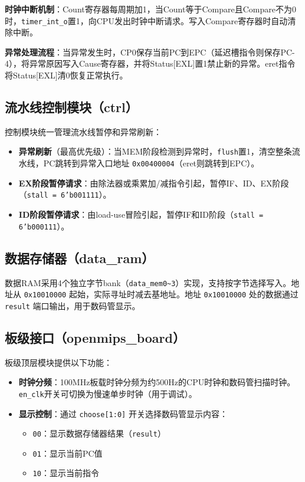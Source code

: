 \textbf{时钟中断机制}：Count寄存器每周期加1，当Count等于Compare且Compare不为0时，\texttt{timer\_int\_o}置1，向CPU发出时钟中断请求。写入Compare寄存器时自动清除中断。

\textbf{异常处理流程}：当异常发生时，CP0保存当前PC到EPC（延迟槽指令则保存PC-4），将异常原因写入Cause寄存器，并将Status[EXL]置1禁止新的异常。eret指令将Status[EXL]清0恢复正常执行。

\subsection{流水线控制模块（ctrl）}

控制模块统一管理流水线暂停和异常刷新：

\begin{itemize}[leftmargin=2em]
    \item \textbf{异常刷新}（最高优先级）：当MEM阶段检测到异常时，\texttt{flush}置1，清空整条流水线，PC跳转到异常入口地址 \texttt{0x00400004}（eret则跳转到EPC）。
    \item \textbf{EX阶段暂停请求}：由除法器或乘累加/减指令引起，暂停IF、ID、EX阶段（\texttt{stall = 6'b001111}）。
    \item \textbf{ID阶段暂停请求}：由load-use冒险引起，暂停IF和ID阶段（\texttt{stall = 6'b000111}）。
\end{itemize}

\subsection{数据存储器（data\_ram）}

数据RAM采用4个独立字节bank（\texttt{data\_mem0\textasciitilde 3}）实现，支持按字节选择写入。地址从 \texttt{0x10010000} 起始，实际寻址时减去基地址。地址 \texttt{0x10010000} 处的数据通过 \texttt{result} 端口输出，用于数码管显示。

\subsection{板级接口（openmips\_board）}

板级顶层模块提供以下功能：

\begin{itemize}[leftmargin=2em]
    \item \textbf{时钟分频}：100MHz板载时钟分频为约500Hz的CPU时钟和数码管扫描时钟。\texttt{en\_clk}开关可切换为慢速单步时钟（用于调试）。
    \item \textbf{显示控制}：通过 \texttt{choose[1:0]} 开关选择数码管显示内容：
    \begin{itemize}
        \item \texttt{00}：显示数据存储器结果（\texttt{result}）
        \item \texttt{01}：显示当前PC值
        \item \texttt{10}：显示当前指令
    \end{itemize}
\end{itemize}
